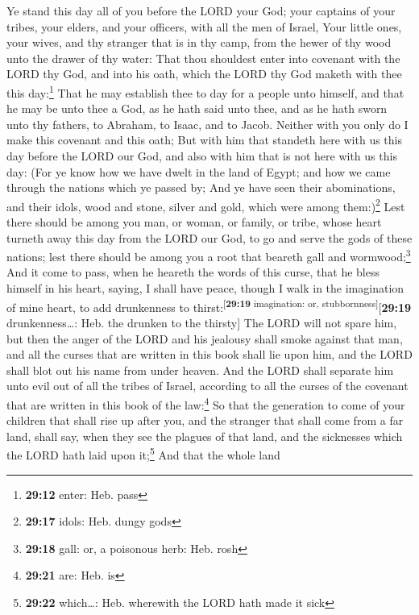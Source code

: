  Ye stand this day all of you before the LORD your God;
your captains of your tribes, your elders, and your officers, with all
the men of Israel,  Your little ones, your wives, and thy
stranger that is in thy camp, from the hewer of thy wood unto the drawer
of thy water:  That thou shouldest enter into covenant
with the LORD thy God, and into his oath, which the LORD thy God maketh
with thee this day:\footnote{\textbf{29:12} enter: Heb. pass}
 That he may establish thee to day for a people unto
himself, and that he may be unto thee a God, as he hath said unto thee,
and as he hath sworn unto thy fathers, to Abraham, to Isaac, and to
Jacob.  Neither with you only do I make this covenant and
this oath;  But with him that standeth here with us this
day before the LORD our God, and also with him that is not here with us
this day:  (For ye know how we have dwelt in the land of
Egypt; and how we came through the nations which ye passed by;
 And ye have seen their abominations, and their idols,
wood and stone, silver and gold, which were among them:)\footnote{\textbf{29:17}
  idols: Heb. dungy gods}  Lest there should be among you
man, or woman, or family, or tribe, whose heart turneth away this day
from the LORD our God, to go and serve the gods of these nations; lest
there should be among you a root that beareth gall and
wormwood;\footnote{\textbf{29:18} gall: or, a poisonous herb: Heb. rosh}
 And it come to pass, when he heareth the words of this
curse, that he bless himself in his heart, saying, I shall have peace,
though I walk in the imagination of mine heart, to add drunkenness to
thirst:\textsuperscript{{[}\textbf{29:19} imagination: or,
stubbornness{]}}{[}\textbf{29:19} drunkenness\ldots: Heb. the drunken to
the thirsty{]}  The LORD will not spare him, but then the
anger of the LORD and his jealousy shall smoke against that man, and all
the curses that are written in this book shall lie upon him, and the
LORD shall blot out his name from under heaven.  And the
LORD shall separate him unto evil out of all the tribes of Israel,
according to all the curses of the covenant that are written in this
book of the law:\footnote{\textbf{29:21} are: Heb. is} 
So that the generation to come of your children that shall rise up after
you, and the stranger that shall come from a far land, shall say, when
they see the plagues of that land, and the sicknesses which the LORD
hath laid upon it;\footnote{\textbf{29:22} which\ldots: Heb. wherewith
  the LORD hath made it sick}  And that the whole land
